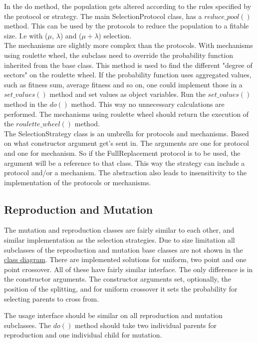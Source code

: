 In the do method, the population gets altered according to the rules specified by the protocol or strategy. The
main SelectionProtocol class, has a $reduce\_pool()$ method. This can be used by the protocols to reduce the 
population to a fitable size. I.e with ($\mu$, $\lambda$) and ($\mu + \lambda$) selection. \\

The mechanisms are slightly more complex than the protocols. With mechanisms using roulette wheel, the 
subclass need to override the probability function inherited from the base class. This method is used to find the
different "degree of sectors" on the roulette wheel. If the probability function uses aggregated values, such as
fitness sum, average fitness and so on, one could implement those in a $set\_values()$ method and set values
as object variables. Run the $set\_values()$ method in the $do()$ method. This way no unnecessary calculations
are performed. The mechanisms using roulette wheel should return the execution of the $roulette\_wheel()$
method.  \\

The SelectionStrategy class is an umbrella for protocols and mechanisms. Based on what constructor 
argument get's sent in. The arguments are one for protocol and one for mechanism. So if the FullReplacement
protocol is to be used, the argument will be a reference to that class. This way the strategy can include
a protocol and/or a mechanism. The abstraction also leads to insensitivity to the implementation of the protocols
or mechanisms. 

\subsection{Reproduction and Mutation}
\label{sec:repmut}
The mutation and reproduction classes are fairly similar to each other, and similar implementation as the 
selection strategies. Due to size limitation all subclasses of the reproduction and mutation base classes are not
shown in the \hyperref[fig:classdiagram]{class diagram}. There are implemented solutions for uniform,
two point and one point crossover. All of these have fairly similar interface. The only difference is in the 
constructor arguments. The constructor arguments set, optionally, the position of the splitting, and for
uniform crossover it sets the probability for selecting parents to cross from. 

The usage interface should be similar on all reproduction and mutation subclasses. The $do()$ method should
take two individual parents for reproduction and one individual child for mutation. 

